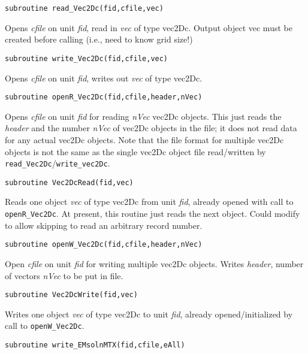 \documentclass[12pt]{article}
\begin{document}
\begin{verbatim}
subroutine read_Vec2Dc(fid,cfile,vec)
\end{verbatim}

Opens {\it cfile} on unit {\it fid}, read in {\it vec}  of type vec2Dc.
Output object vec must be created before calling (i.e.,
need to know grid size!)

\begin{verbatim}
subroutine write_Vec2Dc(fid,cfile,vec)
\end{verbatim}

Opens {\it cfile} on unit {\it fid}, writes out {\it vec} of type vec2Dc.

\begin{verbatim}
subroutine openR_Vec2Dc(fid,cfile,header,nVec)
\end{verbatim}

Opens {\it cfile} on unit {\it fid} for reading 
{\it nVec} vec2Dc objects.
This just reads the {\it header} and the number {\it nVec}
of vec2Dc objects in the file; 
it does not read data for any actual vec2Dc objects.
Note that the file format for multiple vec2Dc objects
is not the same as the single vec2Dc object file read/written
by \verb|read_Vec2Dc|/\verb|write_vec2Dc|.

\begin{verbatim}
subroutine Vec2DcRead(fid,vec)
\end{verbatim}

Reads one object {\it vec} of type 
vec2Dc from unit {\it fid}, already opened
with call to \verb|openR_Vec2Dc|.  At present, this routine
just reads the next object.  Could modify to
allow skipping to read an arbitrary record number.

\begin{verbatim}
subroutine openW_Vec2Dc(fid,cfile,header,nVec)
\end{verbatim}

Open {\it cfile} on unit {\it fid} for writing multiple vec2Dc objects.
Writes {\it header}, number of vectors {\it nVec} to be put in file.

\begin{verbatim}
subroutine Vec2DcWrite(fid,vec)
\end{verbatim}

Writes one object {\it vec} of type vec2Dc to unit {\it fid}, already
opened/initialized by call to \verb|openW_Vec2Dc|.

\begin{verbatim}
subroutine write_EMsolnMTX(fid,cfile,eAll)
\end{verbatim}
\end{document}
